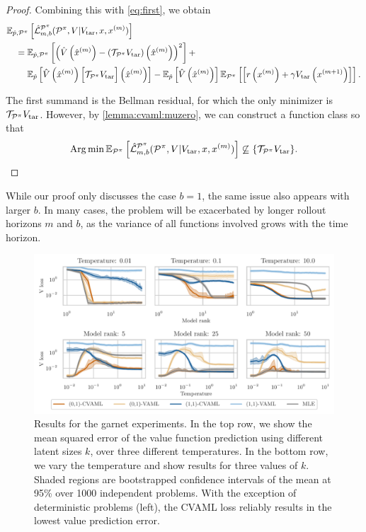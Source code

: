 \begin{proof}
Combining this with \autoref{eq:first}, we obtain
\begin{align}
  &\EEX{\hat{p},\P^\pi}{\hat{\mathcal{L}}^{\P^\pi}_{m,b}(\P^\pi, V| V_{\mathrm{tar}}, x, x^{(m)})}\\
  &\quad = \EEX{\hat{p},\P^\pi}{ \roundb{\hat{V}\roundb{\mx{m}} - \roundb{\mathcal{T}_{\P^\pi}V_\mathrm{tar}}\roundb{\mx{m}}}^2} + \\
  &~ \quad \quad \EEX{\hat{p}}{ \hat{V}\roundb{\mx{m}}\target{m}} - \EEX{\hat{p}}{\hat{V}\roundb{\mx{m}}} \EEX{\P^\pi}{\TrV{m}}.
\end{align}

The first summand is the Bellman residual, for which the only minimizer is $\mathcal{T}_{\P^\pi}V_\mathrm{tar}$.
However, by \autoref{lemma:cvaml:muzero}, we can construct a function class so that $$\Argmin \EEX{\P^\pi}{\hat{\mathcal{L}}^{\P^\pi}_{m,b}(\P^\pi, V| V_{\mathrm{tar}}, x, x^{(m)})} \not \subseteq \{\mathcal{T}_{\P^\pi}V_\mathrm{tar}\}.$$
\end{proof}

While our proof only discusses the case $b=1$, the same issue also appears with larger $b$.
In many cases, the problem will be exacerbated by longer rollout horizons $m$ and $b$, as the variance of all functions involved grows with the time horizon.


\begin{figure}[t]
    \centering
    \includegraphics[width=.9\linewidth]{figures/lambda/plts/v_loss_comparison.pdf}
    \caption{Results for the garnet experiments. 
    In the top row, we show the mean squared error of the value function prediction using different latent sizes $k$, over three different temperatures. 
    In the bottom row, we vary the temperature and show results for three values of $k$. 
    Shaded regions are bootstrapped confidence intervals of the mean at 95\% over 1000 independent problems. 
    With the exception of deterministic problems (left), the CVAML loss reliably results in the lowest value prediction error. }
    \label{fig:cvaml:garnet}
\end{figure}

